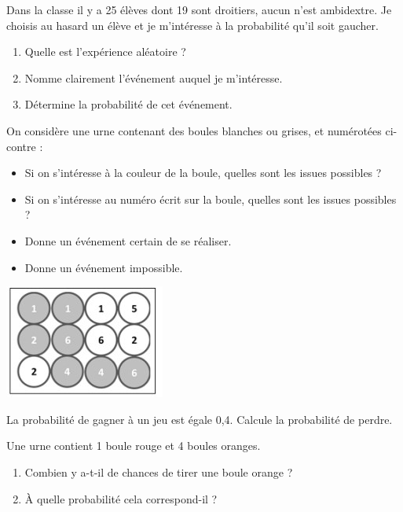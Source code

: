 \begin{pageParcoursd} 
 
 
 
 
Dans la classe il y a 25 élèves dont 19 sont droitiers, aucun n'est ambidextre. Je choisis au hasard un élève et je m'intéresse à la probabilité qu'il soit gaucher.
\begin{enumerate}
\item Quelle est l'expérience aléatoire ?
\item Nomme clairement l'événement auquel je m'intéresse.
\item Détermine la probabilité de cet événement.
\end{enumerate}
 
 
 
 
 \begin{minipage}{.6\linewidth}
 
 On considère une urne contenant des boules blanches ou grises, et numérotées ci-contre :
  \begin{itemize}[leftmargin=*]
\item Si on s'intéresse à la couleur de la boule, quelles sont les issues possibles ?
\item Si on s'intéresse au numéro écrit sur la boule, quelles sont les issues possibles ?
\item Donne un événement certain de se réaliser. 
\item Donne un événement impossible. 
 \end{itemize}

 \end{minipage}
 \begin{minipage}{.4\linewidth}
\includegraphics[scale=1]{FIG/boule.jpg} 

 \end{minipage}
 

La probabilité de gagner à un jeu est égale 0,4. Calcule la probabilité de perdre. 



Une urne contient 1 boule rouge et 4 boules oranges. 

\begin{enumerate}[leftmargin=*]
\item Combien y a-t-il de chances de tirer une boule orange ? 
\item À quelle probabilité cela correspond-il ?
\end{enumerate}

\end{pageParcoursd}
